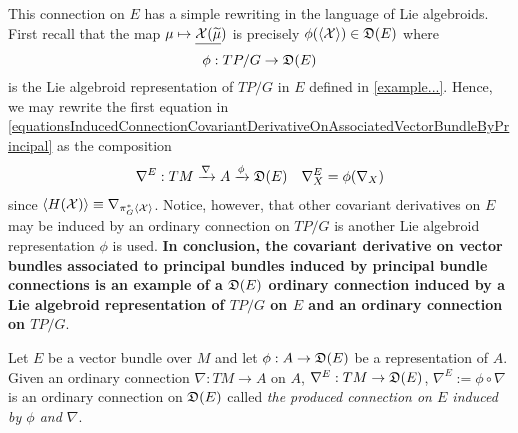 \begin{example}
This connection on $E$ has a simple rewriting in the language of Lie algebroids. First recall that the map $\mu \mapsto \underline{\mathcal{X} (\widetilde{\mu}})$ is precisely $\phi(\cl{\ppal X}) \in \alg D(E)$ where 
\begin{equation}
    \phi: TP/G \to \alg D(E)
\end{equation} 
is the Lie algebroid representation of $TP/G$ in $E$ defined in \ref{example...}. Hence, we may rewrite the first equation in \eqref{equationsInducedConnectionCovariantDerivativeOnAssociatedVectorBundleByPrincipal} as the composition
\begin{align}
    \nabla^E : TM \xrightarrow{\nabla} A \xrightarrow{\phi} \alg D(E) && \nabla_X^E = \phi(\nabla_X)
\end{align}
since $\left\langle H(\mathcal{X}) \right\rangle \equiv \nabla_{\pi^*_G\left\langle \mathcal{X} \right\rangle}$. Notice, however, that other covariant derivatives on $E$ may be induced by an ordinary connection on $TP/G$ is another Lie algebroid representation $\phi$ is used. \textbf{In conclusion, the covariant derivative on vector bundles associated to principal bundles induced by principal bundle connections is an example of a $\mathfrak{D}(E)$ ordinary connection induced by a Lie algebroid representation of $TP/G$ on $E$ and an ordinary connection on $TP/G$}.
\end{example}

\begin{definition}
Let $E$ be a vector bundle over $M$ and let $\phi: A \to \alg D(E)$ be a representation of $A$. Given an ordinary connection $\nabla: TM \to A$ on $A$, $\nabla^E: TM \to \mathfrak{D}(E)$, $\nabla^E := \phi \circ \nabla$ is an ordinary connection on $\mathfrak{D}(E)$ called \emph{the produced connection on $E$ induced by $\phi$ and $\nabla$}.
\end{definition}

